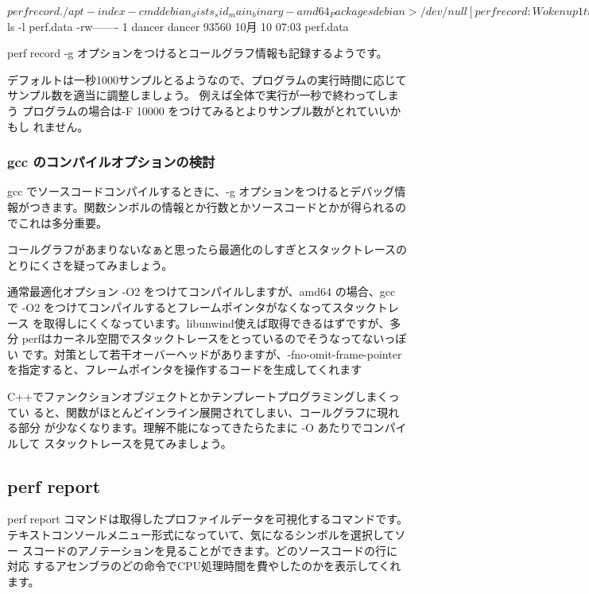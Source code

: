 \documentclass[mingoth,a4paper]{jsarticle}
\begin{document}
\begin{commandline}
$ perf record ./apt-index-cmd debian_dists_sid_main_binary-amd64_Packages  debian > /dev/null
[ perf record: Woken up 1 times to write data ]
[ perf record: Captured and wrote 0.087 MB perf.data (~3800 samples) ]
$ ls -l perf.data
-rw------- 1 dancer dancer 93560 10月 10 07:03 perf.data

\end{commandline}

perf record -g オプションをつけるとコールグラフ情報も記録するようです。

デフォルトは一秒1000サンプルとるようなので、プログラムの実行時間に応じて
サンプル数を適当に調整しましょう。 例えば全体で実行が一秒で終わってしまう
プログラムの場合は-F 10000 をつけてみるとよりサンプル数がとれていいかもし
れません。

\subsubsection{gcc のコンパイルオプションの検討}

gcc でソースコードコンパイルするときに、-g オプションをつけるとデバッグ情
報がつきます。関数シンボルの情報とか行数とかソースコードとかが得られるの
でこれは多分重要。

コールグラフがあまりないなぁと思ったら最適化のしすぎとスタックトレースの
とりにくさを疑ってみましょう。

通常最適化オプション -O2 をつけてコンパイルしますが、amd64 の場合、gcc で
-O2 をつけてコンパイルするとフレームポインタがなくなってスタックトレース
を取得しにくくなっています。libunwind使えば取得できるはずですが、多分
perfはカーネル空間でスタックトレースをとっているのでそうなってないっぽい
です。対策として若干オーバーヘッドがありますが、-fno-omit-frame-pointer
を指定すると、フレームポインタを操作するコードを生成してくれます

C++でファンクションオブジェクトとかテンプレートプログラミングしまくってい
ると、関数がほとんどインライン展開されてしまい、コールグラフに現れる部分
が少なくなります。理解不能になってきたらたまに -O あたりでコンパイルして
スタックトレースを見てみましょう。

\subsection{perf report}

perf report コマンドは取得したプロファイルデータを可視化するコマンドです。
テキストコンソールメニュー形式になっていて、気になるシンボルを選択してソー
スコードのアノテーションを見ることができます。どのソースコードの行に対応
するアセンブラのどの命令でCPU処理時間を費やしたのかを表示してくれます。
\end{document}
